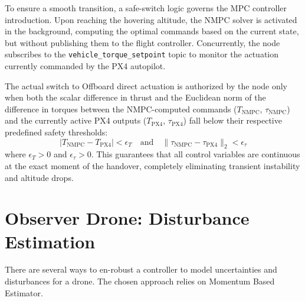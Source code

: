 \noindent To ensure a smooth transition, a safe-switch logic governs the MPC controller introduction. Upon reaching the hovering altitude, the NMPC solver is activated in the background, computing the optimal commands based on the current state, but without publishing them to the flight controller. Concurrently, the node subscribes to the \texttt{vehicle\_torque\_setpoint} topic to monitor the actuation currently commanded by the PX4 autopilot. 

\noindent The actual switch to Offboard direct actuation is authorized by the node only when both the scalar difference in thrust and the Euclidean norm of the difference in torques between the NMPC-computed commands ($T_{\text{NMPC}}$, $\tau_{\text{NMPC}}$) and the currently active PX4 outputs ($T_{\text{PX4}}$, $\tau_{\text{PX4}}$) fall below their respective predefined safety thresholds:
$$|T_{\text{NMPC}} - T_{\text{PX4}}| < \epsilon_{T} \quad \text{and} \quad \|\tau_{\text{NMPC}} - \tau_{\text{PX4}}\|_2 < \epsilon_{\tau}$$
where $\epsilon_{T} > 0$ and $\epsilon_{\tau} > 0$. This guarantees that all control variables are continuous at the exact moment of the handover, completely eliminating transient instability and altitude drops.

\section{Observer Drone: Disturbance Estimation}
There are several ways to en-robust a controller to model uncertainties and disturbances for a drone. The chosen approach relies on Momentum Based Estimator.
